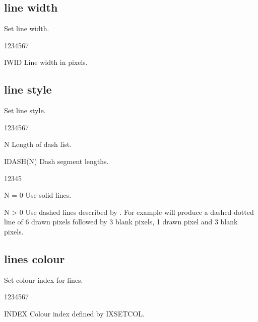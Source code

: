 \subsection{ line width}
%
\Action
Set line width.
\Pdesc
\begin{DLtt}{1234567}
\item[IWID] Line width in pixels.
\end{DLtt}

\subsection{ line style}
%
\Action
Set line style.
\Pdesc
\begin{DLtt}{1234567}
\item[N] Length of dash list.
\item[IDASH(N)] Dash segment lengths.
\begin{DLtt}{12345}
\item[N = 0] Use solid lines.
\item[N > 0] Use dashed lines described by . For example
              will produce a
       dashed-dotted line of 6 drawn pixels followed by 3 blank pixels, 1
       drawn pixel and 3 blank pixels.
\end{DLtt}
\end{DLtt}
\subsection{ lines colour}
%
\Action
Set colour index for lines.
\Pdesc
\begin{DLtt}{1234567}
\item[INDEX] Colour index defined by IXSETCOL.
\end{DLtt}



